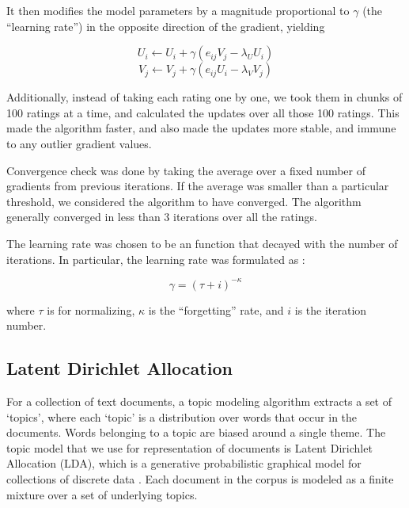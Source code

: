 \documentclass{article} %
\begin{document}
It then modifies the model parameters by a magnitude proportional to $\gamma$ (the ``learning rate'') in the opposite direction of the gradient, yielding

$$ U_i \leftarrow U_i + \gamma (e_{ij} V_j - \lambda_U U_i) $$
$$ V_j \leftarrow V_j + \gamma (e_{ij} U_i - \lambda_V V_j) $$

Additionally, instead of taking each rating one by one, we took them in chunks of 100 ratings at a time, and calculated the updates over all those 100 ratings. This made the algorithm faster, and also made the updates more stable, and immune to any outlier gradient values.

Convergence check was done by taking the average over a fixed number of gradients from previous iterations. If the average was smaller than a particular threshold, we considered the algorithm to have converged. The algorithm generally converged in less than 3 iterations over all the ratings.

The learning rate was chosen to be an function that decayed with the number of iterations. In particular, the learning rate was formulated as :

$$  \gamma = (\tau + i)^{-\kappa}$$

where $\tau$ is for normalizing, $\kappa$ is the ``forgetting'' rate, and $i$ is the iteration number.

\subsection{Latent Dirichlet Allocation}
For a collection of text documents, a topic modeling algorithm extracts a set of
`topics', where each `topic' is a distribution over words that occur in the
documents. Words belonging to a topic are biased around a single theme. The
topic model that we use for representation of documents is Latent Dirichlet 
Allocation (LDA), which is a
generative probabilistic graphical model for collections of discrete data \cite{lda}. Each document in the corpus is modeled as a finite mixture over a set of 
underlying topics.

\end{document}
